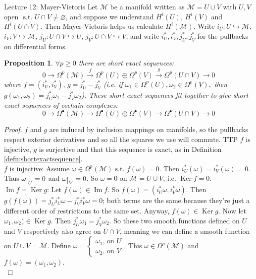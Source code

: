 \documentclass[10pt]{article}
\theoremstyle{plain}
\newtheorem{prop}[thm]{Proposition}
\theoremstyle{definition}
\newcommand{\st}{\text{ s.t. }}
\newcommand{\man}{\mathcal{M}}
\newcommand{\pformman}[1]{\Omega^{#1}(\man)}
\def\restrict#1{\raise-.5ex\hbox{\ensuremath|}_{#1}}
\DeclareMathOperator{\Ker}{Ker}
\DeclareMathOperator{\Ima}{Im}
\newcommand{\UintV}{U\cap V}
\begin{document}
\begin{section}{Lecture 12: Mayer-Vietoris}
Let $\man$ be a manifold written as $\man = U\cup V$ with $U,V$ open $\st \UintV \neq \varnothing$, and suppose we understand $H^i(U), \, H^i(V)$ and $H^i(\UintV)$. Then Mayer-Vietoris helps us calculate $H^i(\man)$. Write $i_U : U \hookrightarrow \man$, $i_V : V\hookrightarrow \man, \, j_U : \UintV \hookrightarrow U, \, j_V: \UintV \hookrightarrow V$, and write $i_U^*,i_V^*,j_U^*,j_V^*$ for the pullbacks on differential forms.
\begin{prop}
$\forall p\geq 0$ there are short exact sequences:
$$0 \to \pformman{p} \xrightarrow{f} \Omega^p(U) \oplus \Omega^p(V) \xrightarrow{g}\Omega^p(\UintV) \to 0$$
where $f = (i_U^*,i_V^*), \, g= j_U^* - j_V^*$ (i.e. if $\omega_1 \in \Omega^p(U), \omega_2 \in \Omega^p(V),$ then $g(\omega_1,\omega_2) = j_U^* \omega_1 - j_V^* \omega_2$). These short exact sequences fit together to give short exact sequences of cochain complexes:
$$0 \to \pformman{\bullet} \to \Omega^\bullet (U) \oplus \Omega^\bullet(V) \to \Omega^\bullet(\UintV) \to 0$$
\end{prop}
\begin{proof}
$f$ and $g$ are induced by inclusion mappings on manifolds, so the pullbacks respect exterior derivatives and so all the squares we use will commute. TTP $f$ is injective, $g$ is surjective and that this sequence is exact, as in Definition \ref{defn:shortexactsequence}.\\
\underline{$f$ is injective}: Assume $\omega \in \pformman{p} \st f(\omega) = 0.$ Then $i_U^*(\omega) = i_V^*(\omega) = 0.$ Thus $\omega\restrict{U} =0 $ and $\omega \restrict{V} = 0$. So $\omega = 0$ on $\man = U\cup V$, i.e. $\Ker f = 0$.\\
$\underline{\Ima f = \Ker g}$: Let $f(\omega) \in \Ima f$. So $f(\omega) = (i_U^*\omega, i_V^*\omega).$ Then $g(f(\omega)) = j_U^* i_U^* \omega - j_V^*i_V^*\omega = 0 $; both terms are the same because they're just a different order of restrictions to the same set. Anyway, $f(\omega) \in \Ker g$. Now let $\omega_1,\omega_2)\in \Ker g.$ Then $j_U^* \omega_1 = j_V^* \omega_2$. So these two smooth functions defined on $U$ and $V$ respectively also agree on $\UintV$, meaning we can define a smooth function on $U\cup V = \man$. Define $\omega = \begin{cases} \omega_1 \text{, on } U \\ \omega_2  \text{, on }V \end{cases}$. This $\omega \in \pformman{p}$ and $f(\omega) = (\omega_1,\omega_2)$. \\

\end{proof}
\end{section}
\end{document}
